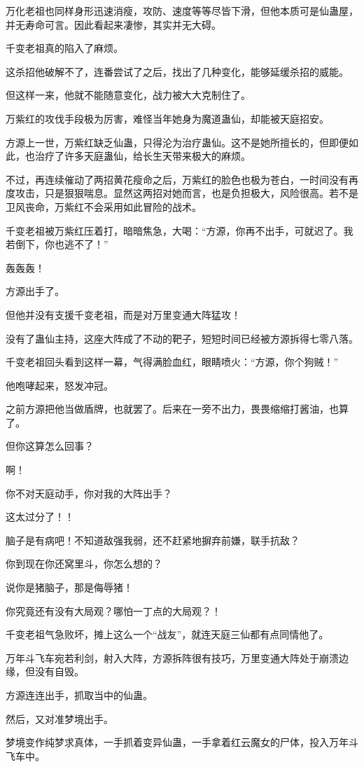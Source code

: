 \begin{this_body}
万化老祖也同样身形迅速消瘦，攻防、速度等等尽皆下滑，但他本质可是仙蛊屋，并无寿命可言。因此看起来凄惨，其实并无大碍。

千变老祖真的陷入了麻烦。

这杀招他破解不了，连番尝试了之后，找出了几种变化，能够延缓杀招的威能。

但这样一来，他就不能随意变化，战力被大大克制住了。

万紫红的攻伐手段极为厉害，难怪当年她身为魔道蛊仙，却能被天庭招安。

方源上一世，万紫红缺乏仙蛊，只得沦为治疗蛊仙。这不是她所擅长的，但即便如此，也治疗了许多天庭蛊仙，给长生天带来极大的麻烦。

不过，再连续催动了两招黄花瘦命之后，万紫红的脸色也极为苍白，一时间没有再度攻击，只是狠狠喘息。显然这两招对她而言，也是负担极大，风险很高。若不是卫风丧命，万紫红不会采用如此冒险的战术。

千变老祖被万紫红压着打，暗暗焦急，大喝：“方源，你再不出手，可就迟了。我若倒下，你也逃不了！”

轰轰轰！

方源出手了。

但他并没有支援千变老祖，而是对万里变通大阵猛攻！

没有了蛊仙主持，这座大阵成了不动的靶子，短短时间已经被方源拆得七零八落。

千变老祖回头看到这样一幕，气得满脸血红，眼睛喷火：“方源，你个狗贼！”

他咆哮起来，怒发冲冠。

之前方源把他当做盾牌，也就罢了。后来在一旁不出力，畏畏缩缩打酱油，也算了。

但你这算怎么回事？

啊！

你不对天庭动手，你对我的大阵出手？

这太过分了！！

脑子是有病吧！不知道敌强我弱，还不赶紧地摒弃前嫌，联手抗敌？

你到现在你还窝里斗，你怎么想的？

说你是猪脑子，那是侮辱猪！

你究竟还有没有大局观？哪怕一丁点的大局观？！

千变老祖气急败坏，摊上这么一个“战友”，就连天庭三仙都有点同情他了。

万年斗飞车宛若利剑，射入大阵，方源拆阵很有技巧，万里变通大阵处于崩溃边缘，但没有自毁。

方源连连出手，抓取当中的仙蛊。

然后，又对准梦境出手。

梦境变作纯梦求真体，一手抓着变异仙蛊，一手拿着红云魔女的尸体，投入万年斗飞车中。


\end{this_body}
